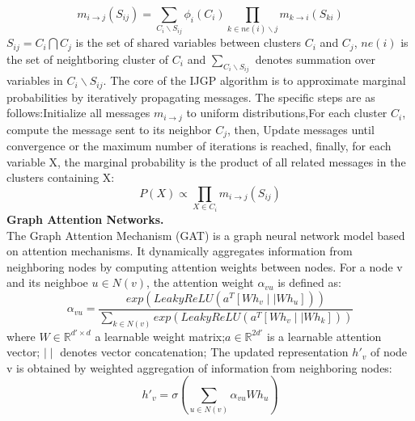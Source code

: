 \begin{equation}
m_{i\rightarrow j}(S_{ij})=\sum\limits_{C_i\backslash S_{ij}}\phi_i(C_i)\prod\limits_{k\in ne(i)\backslash j}m_{k\rightarrow i}(S_{ki})
\end{equation}
\(S_{ij}=C_i\bigcap C_j\) is the set of shared variables between clusters \(C_i\) and \(C_j\),  \(ne(i)\) is the set of neightboring cluster of \(C_i\) and \(\sum\limits_{C_i\backslash S_{ij}}\) denotes summation over variables in \(C_i\backslash S_{ij}\).
The core of the IJGP algorithm is to approximate marginal probabilities by iteratively propagating messages. The specific steps are as follows:Initialize all messages \(m_{i\rightarrow j}\) to uniform distributions,For each cluster \(C_i\), compute the message sent to its neighbor \(C_j\), then, Update messages until convergence or the maximum number of iterations is reached, finally, for each variable X, the marginal probability is the product of all related messages in the clusters containing X:
\begin{equation}
P(X)\propto\prod\limits_{X\in C_i}m_{i\rightarrow j}(S_{ij})
\end{equation}
\textbf{Graph Attention Networks.}\\
The Graph Attention Mechanism (GAT) is a graph neural network model based on attention mechanisms. It dynamically aggregates information from neighboring nodes by computing attention weights between nodes.
For a node v and its neighboe \(u \in N(v)\), the attention weight \(\alpha_{vu}\) is defined as:
\begin{equation}
\alpha_{vu}=\frac{exp(LeakyReLU(a^T[Wh_v\mid\mid Wh_u]))}{\sum\limits_{k\in N(v)}exp(LeakyReLU(a^T[Wh_v\mid\mid Wh_k]))}
\end{equation}
where \(W\in \mathbb{R}^{d'\times d}\) a learnable weight matrix;\(a\in \mathbb{R}^{2d'}\) is a learnable attention vector; \(\mid\mid\) denotes vector concatenation; 
The updated representation \(h'_v\) of node v is obtained by weighted aggregation of information from neighboring nodes:
\begin{equation}
h'_v=\sigma(\sum\limits_{u\in N(v)}\alpha_{vu} Wh_u)
\end{equation}
